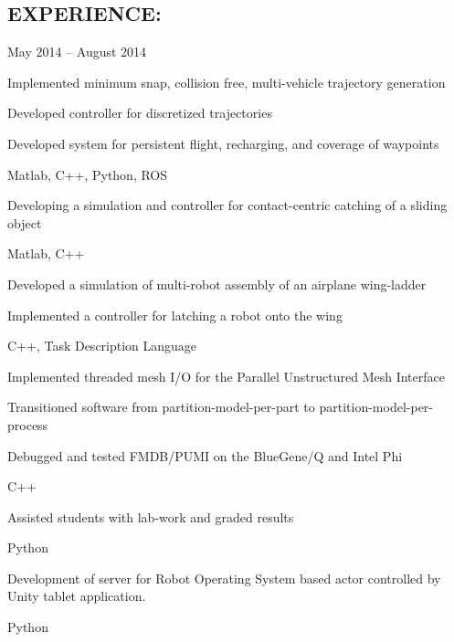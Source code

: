 \begin{resume}
 \section{EXPERIENCE:}      
    {May 2014 -- August 2014}
  {
    \item Implemented minimum snap, collision free, multi-vehicle trajectory
      generation
    \item Developed controller for discretized trajectories
    \item Developed system for persistent flight, recharging, and coverage of waypoints
    \item Matlab, C++, Python, ROS
  }
  {
    \item Developing a simulation and controller for contact-centric catching of a sliding object
    \item Matlab, C++
  }
  {
    \item Developed a simulation of multi-robot assembly of an airplane wing-ladder
    \item Implemented a controller for latching a robot onto the wing 
    \item C++, Task Description Language
  }
  {
		\item Implemented threaded mesh I/O for the Parallel Unstructured Mesh Interface
    \item Transitioned software from partition-model-per-part to partition-model-per-process
		\item Debugged and tested FMDB/PUMI on the BlueGene/Q and Intel Phi
    \item C++
  }
  {
		\item Assisted students with lab-work and graded results
    \item Python
  }
  {
		\item Development of server for Robot Operating System based actor
			controlled by Unity tablet application.
    \item Python
  }

\end{resume}
